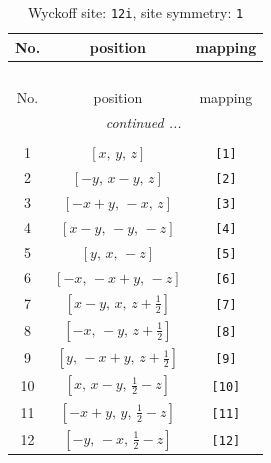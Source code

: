 \documentclass[fleqn,8pt]{jsarticle}
\begin{document}
\renewcommand{\arraystretch}{1.2}
\begin{longtable}{ccc}
\caption{Wyckoff site: {\tt 12i}, site symmetry: {\tt 1}}
 \\
 \hline \hline
No. & position & mapping \\ \hline \endfirsthead

\multicolumn{2}{l}{\tablename\ \thetable{}} \\
 \hline \hline
No. & position & mapping \\ \hline \endhead

 \hline \hline
\multicolumn{2}{r}{\footnotesize\it continued ...} \\ \endfoot

 \hline \hline
\multicolumn{2}{r}{} \\ \endlastfoot

1 & $\left[ x,\, y,\, z \right]$ & {\tt [1]} \\ \hline
2 & $\left[ - y,\, x - y,\, z \right]$ & {\tt [2]} \\ \hline
3 & $\left[ - x + y,\, - x,\, z \right]$ & {\tt [3]} \\ \hline
4 & $\left[ x - y,\, - y,\, - z \right]$ & {\tt [4]} \\ \hline
5 & $\left[ y,\, x,\, - z \right]$ & {\tt [5]} \\ \hline
6 & $\left[ - x,\, - x + y,\, - z \right]$ & {\tt [6]} \\ \hline
7 & $\left[ x - y,\, x,\, z + \frac{1}{2} \right]$ & {\tt [7]} \\ \hline
8 & $\left[ - x,\, - y,\, z + \frac{1}{2} \right]$ & {\tt [8]} \\ \hline
9 & $\left[ y,\, - x + y,\, z + \frac{1}{2} \right]$ & {\tt [9]} \\ \hline
10 & $\left[ x,\, x - y,\, \frac{1}{2} - z \right]$ & {\tt [10]} \\ \hline
11 & $\left[ - x + y,\, y,\, \frac{1}{2} - z \right]$ & {\tt [11]} \\ \hline
12 & $\left[ - y,\, - x,\, \frac{1}{2} - z \right]$ & {\tt [12]} \\
\end{longtable}
\end{document}
